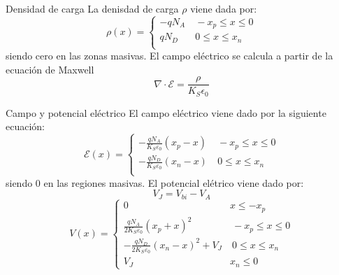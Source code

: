 \documentclass[aspectratio=169,xcolor=dvipsnames]{beamer}
\newcommand{\parentesis}[1]{\left( #1  \right)}
\newcommand{\Ecal}{\mathcal{E}}
\begin{document}
\begin{frame}{Densidad de carga}
    La denisdad de carga $\rho$ viene dada por:
    \begin{equation*}
        \rho (x) = \left\lbrace \begin{array}{ll}
            - q N_A   & \ - x_p \leq x \leq 0 \\
            q N_D  & \ 0 \leq x \leq x_n \\
        \end{array} \right.
    \end{equation*}
    siendo cero en las zonas masivas. El campo eléctrico se calcula a partir de la ecuación de Maxwell
    \begin{equation*}
        \nabla \cdot \Ecal = \frac{\rho}{K_S \epsilon_0}
    \end{equation*}
\end{frame}

\begin{frame}{Campo y potencial eléctrico}
    El campo eléctrico viene dado por la siguiente ecuación: 
    \begin{equation*}
        \Ecal(x) = \left\lbrace \begin{array}{ll}
            - \frac{qN_A}{K_S\varepsilon_0} \parentesis{x_p - x}  & \ - x_p \leq x \leq 0 \\
            - \frac{qN_D}{K_S\varepsilon_0} \parentesis{x_n - x} & \ 0 \leq x \leq x_n \\
        \end{array} \right.
    \end{equation*}
    siendo 0 en las regiones masivas. El potencial elétrico viene dado por: 
    \begin{equation*}
        V_{J} = V_{bi} - V_A
    \end{equation*}
    \begin{equation*}
        V(x) = \left\lbrace \begin{array}{ll}
            0  & x \leq -x_p  \\
            \frac{qN_A}{2K_S\varepsilon_0} \parentesis{x_p + x}^2  & \ - x_p \leq x \leq 0 \\
            - \frac{qN_D}{2K_S\varepsilon_0} \parentesis{x_n - x}^2 + V_{J}  & \ 0 \leq x \leq x_n \\
            V_{J} & x_n \leq 0
        \end{array} \right.
    \end{equation*}
\end{frame}
\end{document}
